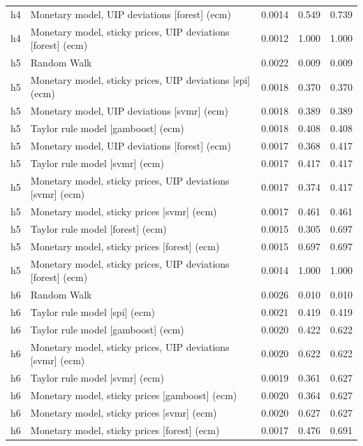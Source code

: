 \begin{ThreePartTable}
\begin{longtable}[t]{cp{5.5cm}ccc}
h4 & \raggedright Monetary model, UIP deviations [forest] (ecm) & 0.0014 & 0.549 & 0.739\\
h4 & \raggedright Monetary model, sticky prices, UIP deviations [forest] (ecm) & 0.0012 & 1.000 & 1.000\\
\addlinespace
h5 & \raggedright Random Walk & 0.0022 & 0.009 & 0.009\\
h5 & \raggedright Monetary model, sticky prices, UIP deviations [spi] (ecm) & 0.0018 & 0.370 & 0.370\\
h5 & \raggedright Monetary model, UIP deviations [svmr] (ecm) & 0.0018 & 0.389 & 0.389\\
h5 & \raggedright Taylor rule model [gamboost] (ecm) & 0.0018 & 0.408 & 0.408\\
h5 & \raggedright Monetary model, UIP deviations [forest] (ecm) & 0.0017 & 0.368 & 0.417\\
h5 & \raggedright Taylor rule model [svmr] (ecm) & 0.0017 & 0.417 & 0.417\\
h5 & \raggedright Monetary model, sticky prices, UIP deviations [svmr] (ecm) & 0.0017 & 0.374 & 0.417\\
h5 & \raggedright Monetary model, sticky prices [svmr] (ecm) & 0.0017 & 0.461 & 0.461\\
h5 & \raggedright Taylor rule model [forest] (ecm) & 0.0015 & 0.305 & 0.697\\
h5 & \raggedright Monetary model, sticky prices [forest] (ecm) & 0.0015 & 0.697 & 0.697\\
h5 & \raggedright Monetary model, sticky prices, UIP deviations [forest] (ecm) & 0.0014 & 1.000 & 1.000\\
\addlinespace
h6 & \raggedright Random Walk & 0.0026 & 0.010 & 0.010\\
h6 & \raggedright Taylor rule model [spi] (ecm) & 0.0021 & 0.419 & 0.419\\
h6 & \raggedright Taylor rule model [gamboost] (ecm) & 0.0020 & 0.422 & 0.622\\
h6 & \raggedright Monetary model, sticky prices, UIP deviations [svmr] (ecm) & 0.0020 & 0.622 & 0.622\\
h6 & \raggedright Taylor rule model [svmr] (ecm) & 0.0019 & 0.361 & 0.627\\
h6 & \raggedright Monetary model, sticky prices [gamboost] (ecm) & 0.0020 & 0.364 & 0.627\\
h6 & \raggedright Monetary model, sticky prices [svmr] (ecm) & 0.0020 & 0.627 & 0.627\\
h6 & \raggedright Monetary model, sticky prices [forest] (ecm) & 0.0017 & 0.476 & 0.691\\

\end{longtable}
\end{ThreePartTable}
